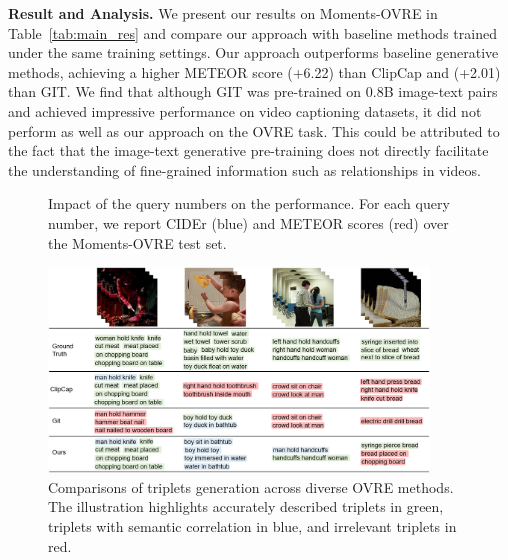 \documentclass[letterpaper]{article}
\begin{document}
\noindent\textbf{Result and Analysis. }
We present our results on Moments-OVRE in Table~\ref{tab:main_res} and compare our approach with baseline methods trained under the same training settings. 
Our approach outperforms baseline generative methods, achieving a higher METEOR score (+6.22) than ClipCap and (+2.01) than GIT. 
We find that although GIT was pre-trained on 0.8B image-text pairs and achieved impressive performance on video captioning datasets, it did not perform as well as our approach on the OVRE task. This could be attributed to the fact that the image-text generative pre-training does not directly facilitate the understanding of fine-grained information such as relationships in videos.

\begin{figure}
  \centering
  \caption{Impact of the query numbers on the performance. For each query number, we report CIDEr (blue) and METEOR scores (red)  over the Moments-OVRE test set. }
   \label{fig:abl_qnumber}
   \vspace{-0.5cm} 
\end{figure}


\begin{figure}[ht]
  \centering
  \includegraphics[width=0.9\textwidth]{fig/tab.png}
  \caption{Comparisons of triplets generation across diverse OVRE methods. 
  The illustration highlights accurately described triplets in green, triplets with semantic correlation in blue, and irrelevant triplets in red.
  }
  \label{fig:visualize}
  \vspace{-0.2cm} 
\end{figure}
\end{document}
